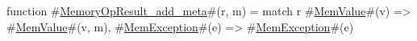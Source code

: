 function #\hyperref[sailRISCVzMemoryOpResultzyaddzymeta]{MemoryOpResult\_add\_meta}#(r, m) = match r {
  #\hyperref[sailRISCVzMemValue]{MemValue}#(v)     => #\hyperref[sailRISCVzMemValue]{MemValue}#(v, m),
  #\hyperref[sailRISCVzMemException]{MemException}#(e) => #\hyperref[sailRISCVzMemException]{MemException}#(e)
}

